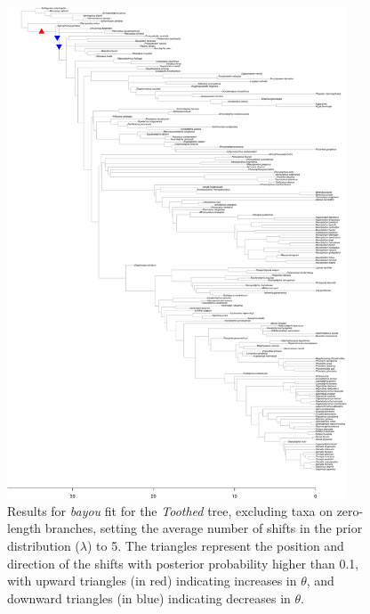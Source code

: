 \begin{figure}[H]
\includegraphics[width=0.9\textwidth]{img/plots-toothed-k5-1.pdf}
\caption{Results for \textit{bayou} fit for the \textit{Toothed} tree, excluding taxa on zero-length branches, setting the average number of shifts in the prior distribution ($\lambda$) to 5. The triangles represent the position and direction of the shifts with posterior probability higher than 0.1, with upward triangles (in red) indicating increases in $\theta$, and downward triangles (in blue) indicating decreases in $\theta$.}
\label{fig:toothed-k5-nzlb}
\end{figure}

\newpage


